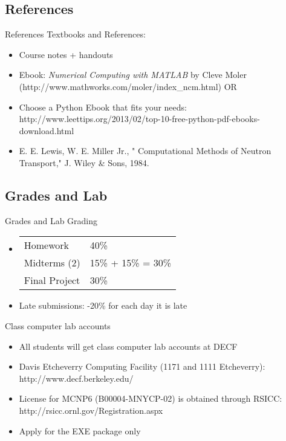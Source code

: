 \documentclass[xcolor=x11names,compress]{beamer}
\renewcommand{\(}{\begin{columns}}
\renewcommand{\)}{\end{columns}}
\newcommand{\<}[1]{\begin{column}{#1}}
\renewcommand{\>}{\end{column}}
\begin{document}
\subsection{References}
\begin{frame}{References}
Textbooks and References:
\begin{itemize}
\item Course notes + handouts
\item Ebook: \emph{Numerical Computing with MATLAB} by Cleve Moler (http://www.mathworks.com/moler/index\_ncm.html) OR
\item Choose a Python Ebook that fits your needs: http://www.leettips.org/2013/02/top-10-free-python-pdf-ebooks-download.html
\item E. E. Lewis, W. E. Miller Jr., " Computational Methods of Neutron
Transport," J. Wiley & Sons, 1984.
\end{itemize}
\end{frame}

\subsection{Grades and Lab}
\begin{frame}{Grades and Lab}
Grading
\begin{itemize}
\item \begin{tabular}{ll}
Homework & 40\% \\
Midterms (2) & 15\% + 15\% = 30\% \\
Final Project & 30\% 
\end{tabular}
\item Late submissions: -20\% for each day it is late
\end{itemize}
\item Class computer lab accounts
\begin{itemize}
\item All students will get class computer lab accounts at DECF
\item Davis Etcheverry Computing Facility (1171 and 1111 Etcheverry): http://www.decf.berkeley.edu/
\item License for MCNP6 (B00004-MNYCP-02) is obtained through RSICC:
http://rsicc.ornl.gov/Registration.aspx
\item Apply for the EXE package only
\end{itemize}
\end{frame}
\end{document}
